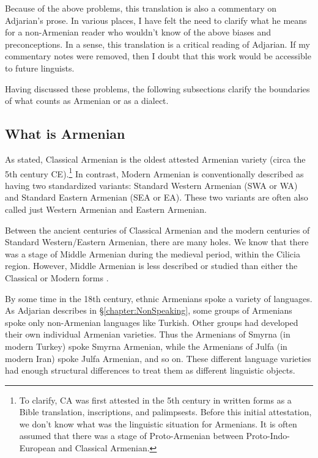 Because of the above problems, this translation is also a commentary on Adjarian's prose. In various places, I have felt the need to clarify what he means for a non-Armenian reader who wouldn't know of the above biases and preconceptions. In a sense, this translation is a critical reading of Adjarian. If my commentary notes were removed, then I doubt that this work would be accessible to future linguists.


Having discussed these problems, the following subsections clarify the boundaries of what counts as Armenian or as a dialect. 

\subsection{What is Armenian}\label{sec:HossepIntro:armenian:whatisarm}

As stated, Classical Armenian is the oldest attested Armenian variety (circa the 5th century CE).\footnote{To clarify, CA was first attested in the 5th century in written forms as a Bible translation, inscriptions, and palimpsests. Before this initial attestation, we don't know what was the linguistic situation for Armenians. It is often assumed that there was a stage of Proto-Armenian between Proto-Indo-European and Classical Armenian. } In contrast, Modern Armenian is conventionally described as having two standardized variants: Standard Western Armenian (SWA or WA) and Standard Eastern Armenian (SEA or EA). These two variants are often also called just Western Armenian and Eastern Armenian. 

Between the ancient centuries of Classical Armenian and the modern centuries of Standard Western/Eastern Armenian, there are many holes. We know that there was a stage of Middle Armenian during the medieval period, within the Cilicia region. However, Middle Armenian is less described or studied than either the Classical or Modern forms \citep{Karst-1901-MiddleArmenain}. 

By some time in the 18th century, ethnic Armenians spoke a variety of languages. As Adjarian describes in \S\ref{chapter:NonSpeaking}, some groups of Armenians spoke only non-Armenian languages like Turkish. Other groups had developed their own individual Armenian varieties. Thus the Armenians of Smyrna (in modern Turkey) spoke Smyrna Armenian, while the Armenians of Julfa (in modern Iran) spoke Julfa Armenian, and so on. These different language varieties had enough structural differences to treat them as different linguistic objects. 

